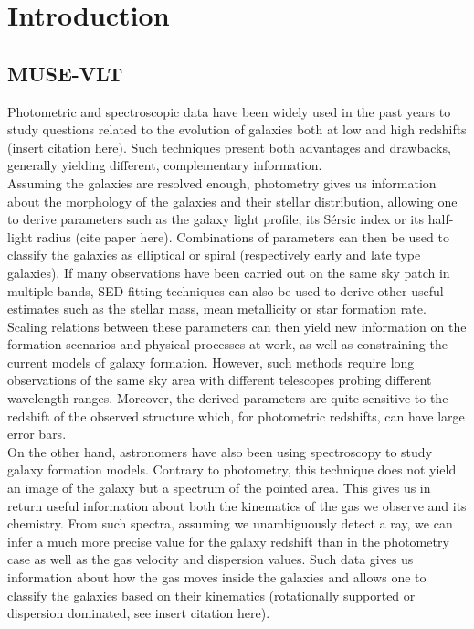 \clearpage
\section{Introduction}
\label{sec:Intro}

\subsection{MUSE-VLT}
\label{subsec:MUSE-VLT}

Photometric and spectroscopic data have been widely used in the past years to study questions related to the evolution of galaxies both at low and high redshifts (insert citation here). Such techniques present both advantages and drawbacks, generally yielding different, complementary information. \\

Assuming the galaxies are resolved enough, photometry gives us information about the morphology of the galaxies and their stellar distribution, allowing one to derive parameters such as the galaxy light profile, its Sérsic index or its half-light radius (cite paper here). Combinations of parameters can then be used to classify the galaxies as elliptical or spiral (respectively early and late type galaxies). If many observations have been carried out on the same sky patch in multiple bands, SED fitting techniques can also be used to derive other useful estimates such as the stellar mass, mean metallicity or star formation rate. Scaling relations between these parameters can then yield new information on the formation scenarios and physical processes at work, as well as constraining the current models of galaxy formation. However, such methods require long observations of the same sky area with different telescopes probing different wavelength ranges. Moreover, the derived parameters are quite sensitive to the redshift of the observed structure which, for photometric redshifts, can have large error bars. \\

On the other hand, astronomers have also been using spectroscopy to study galaxy formation models. Contrary to photometry, this technique does not yield an image of the galaxy but a spectrum of the pointed area. This gives us in return useful information about both the kinematics of the gas we observe and its chemistry. From such spectra, assuming we unambiguously detect a ray, we can infer a much more precise value for the galaxy redshift than in the photometry case as well as the gas velocity and dispersion values. Such data gives us information about how the gas moves inside the galaxies and allows one to classify the galaxies based on their kinematics (rotationally supported or dispersion dominated, see insert citation here). \\

